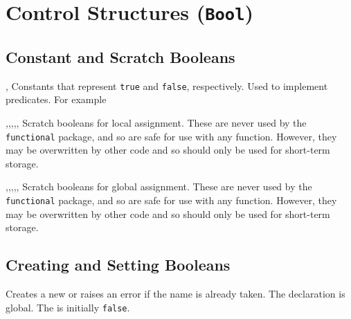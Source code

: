 \documentclass[oneside]{book}
\begin{document}
\chapter{Control Structures (\texttt{Bool})}

\section{Constant and Scratch Booleans}

\begin{variable}{\cTrueBool,\cFalseBool}
Constants that represent \verb|true| and \verb|false|, respectively. Used to
implement predicates. For example
\begin{demohigh}
\BoolVarIfTF {} {}
\BoolVarIfTF {} {}
\end{demohigh}
\end{variable}

\begin{variable}{\lTmpaBool,\lTmpbBool,\lTmpcBool,\lTmpiBool,\lTmpjBool,\lTmpkBool}
Scratch booleans for local assignment. These are never used by
the \verb!functional! package, and so are safe for use with any
function. However, they may be overwritten by other
code and so should only be used for short-term storage.
\end{variable}

\begin{variable}{\gTmpaBool,\gTmpbBool,\gTmpcBool,\gTmpiBool,\gTmpjBool,\gTmpkBool}
Scratch booleans for global assignment. These are never used by
the \verb!functional! package, and so are safe for use with any
function. However, they may be overwritten by other
code and so should only be used for short-term storage.
\end{variable}

\section{Creating and Setting Booleans}

\begin{function}{\BoolNew}
\begin{syntax}
 
\end{syntax}
Creates a new  or raises an error if the
name is already taken. The declaration is global. The
 is initially \texttt{false}.
\end{function}
\end{document}
